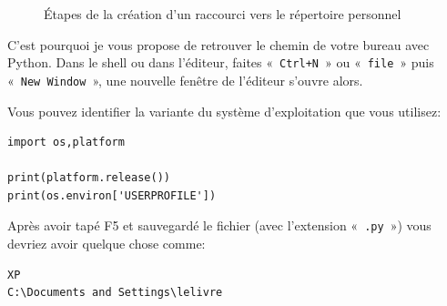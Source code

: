 \begin{figure}[H]
{\label{fig:comptera}
}

\caption{Étapes de la création d'un raccourci vers le répertoire personnel}
\label{fig:etapesra}
\end{figure}


C'est pourquoi je vous propose de retrouver le chemin de votre bureau avec Python.
Dans le shell ou dans l'éditeur, faites «~\texttt{Ctrl+N}~» ou «~\texttt{file}~» puis   
«~\texttt{New Window}~», une nouvelle fenêtre de l'éditeur s'ouvre alors.

Vous pouvez identifier la variante du système d'exploitation que vous utilisez:
\begin{Verbatim}[frame=single,rulecolor=\color{mbleu}, label=à taper]
import os,platform

print(platform.release())
print(os.environ['USERPROFILE'])
\end{Verbatim}

Après avoir tapé F5 et sauvegardé le fichier (avec l'extension «~\texttt{.py}~»)  vous devriez avoir quelque chose comme:

\begin{Verbatim}[frame=single,rulecolor=\color{gray}, label=résultat]
XP
C:\Documents and Settings\lelivre
\end{Verbatim}

